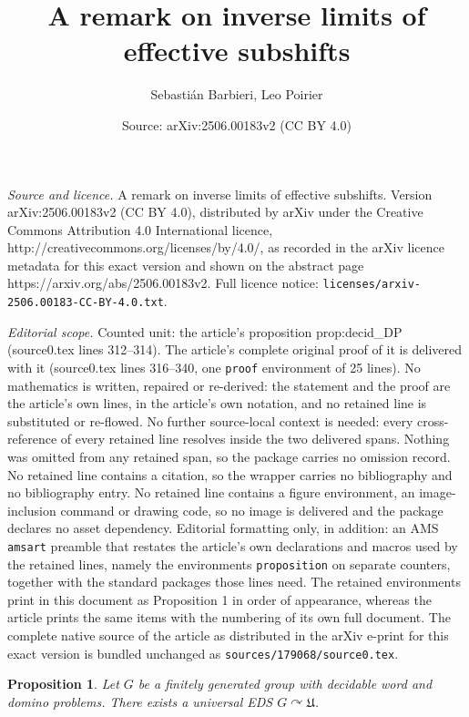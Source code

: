 \documentclass[10pt,a4paper]{amsart}
\title{A remark on inverse limits of effective subshifts}
\author{Sebasti\'an Barbieri, Leo Poirier}
\date{Source: arXiv:2506.00183v2 (CC BY 4.0)}
\newtheorem{proposition}{Proposition}
\begin{document}
\maketitle

\noindent\emph{Source and licence.} A remark on inverse limits of effective subshifts. Version arXiv:2506.00183v2 (CC BY 4.0), distributed by arXiv under the Creative Commons Attribution 4.0 International licence, http://creativecommons.org/licenses/by/4.0/, as recorded in the arXiv licence metadata for this exact version and shown on the abstract page https://arxiv.org/abs/2506.00183v2. Full licence notice: \texttt{licenses/arxiv-2506.00183-CC-BY-4.0.txt}.\par\smallskip

\noindent\textit{Editorial scope.} Counted unit: the article's proposition prop:decid\_DP (source0.tex lines 312--314). The article's complete original proof of it is delivered with it (source0.tex lines 316--340, one \texttt{proof} environment of 25 lines). No mathematics is written, repaired or re-derived: the statement and the proof are the article's own lines, in the article's own notation, and no retained line is substituted or re-flowed.  No further source-local context is needed: every cross-reference of every retained line resolves inside the two delivered spans.  Nothing was omitted from any retained span, so the package carries no omission record.  No retained line contains a citation, so the wrapper carries no bibliography and no bibliography entry.  No retained line contains a figure environment, an image-inclusion command or drawing code, so no image is delivered and the package declares no asset dependency.  Editorial formatting only, in addition: an AMS \texttt{amsart} preamble that restates the article's own declarations and macros used by the retained lines, namely the environments \texttt{proposition} on separate counters, together with the standard packages those lines need.  The retained environments print in this document as Proposition 1 in order of appearance, whereas the article prints the same items with the numbering of its own full document.  The complete native source of the article as distributed in the arXiv e-print for this exact version is bundled unchanged as \texttt{sources/179068/source0.tex}.
\begin{proposition}\label{prop:decid_DP}
    Let $G$ be a finitely generated group with decidable word and domino problems. There exists a universal EDS $G\curvearrowright \mathfrak{U}$.
\end{proposition}
\end{document}
